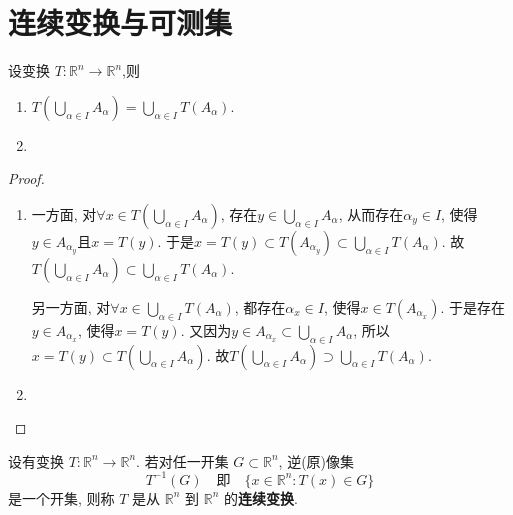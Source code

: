 \documentclass[../../main.tex]{subfiles}%
\begin{document}
\section{连续变换与可测集}

\begin{theorem}[变换的基本性质]\label{theorem:变换的基本性质}
设变换 $T:\mathbb{R}^n\to\mathbb{R}^n$,则
\begin{enumerate}
\item $T\left( \bigcup_{\alpha \in I}{A_{\alpha}} \right) =\bigcup_{\alpha \in I}{T\left( A_{\alpha} \right)}$.

\item 
\end{enumerate}
\end{theorem}
\begin{proof}
\begin{enumerate}
\item 一方面, 对$\forall x\in T\left( \bigcup_{\alpha \in I}{A_{\alpha}} \right)$, 存在$y\in \bigcup_{\alpha \in I}{A_{\alpha}}$, 从而存在$\alpha _y\in I$, 使得$y\in A_{\alpha _y}$且$x=T\left( y \right)$. 于是$x=T\left( y \right) \subset T\left( A_{\alpha _y} \right) \subset \bigcup_{\alpha \in I}{T\left( A_{\alpha} \right)}$. 故$T\left( \bigcup_{\alpha \in I}{A_{\alpha}} \right) \subset \bigcup_{\alpha \in I}{T\left( A_{\alpha} \right)}$.

另一方面, 对$\forall x\in \bigcup_{\alpha \in I}{T\left( A_{\alpha} \right)}$, 都存在$\alpha _x\in I$, 使得$x\in T\left( A_{\alpha _x} \right)$. 于是存在$y\in A_{\alpha _x}$, 使得$x=T\left( y \right)$. 又因为$y\in A_{\alpha _x}\subset \bigcup_{\alpha \in I}{A_{\alpha}}$, 所以$x=T\left( y \right) \subset T\left( \bigcup_{\alpha \in I}{A_{\alpha}} \right)$. 故$T\left( \bigcup_{\alpha \in I}{A_{\alpha}} \right) \supset \bigcup_{\alpha \in I}{T\left( A_{\alpha} \right)}$.

\item 
\end{enumerate}

\end{proof}

\begin{definition}[连续变换]
设有变换 $T:\mathbb{R}^n\to\mathbb{R}^n$. 若对任一开集 $G\subset\mathbb{R}^n$, 逆(原)像集
\[
T^{-1}(G)\quad \text{即}\quad \{x\in\mathbb{R}^n:T(x)\in G\}
\]
是一个开集, 则称 $T$ 是从 $\mathbb{R}^n$ 到 $\mathbb{R}^n$ 的\textbf{连续变换}.
\end{definition}
\end{document}
